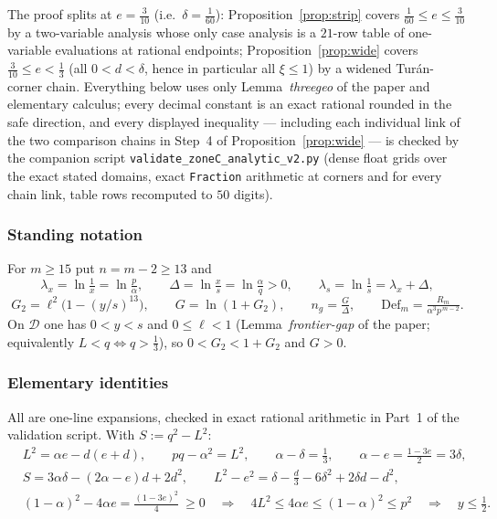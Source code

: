 \documentclass[11pt]{article}
\theoremstyle{remark}
\theoremstyle{plain}
\theoremstyle{plain}
\newcommand{\D}{\mathcal D}
\begin{document}
The proof splits at $e=\tfrac3{10}$ (i.e.\ $\delta=\tfrac1{60}$):
Proposition~\ref{prop:strip} covers $\tfrac1{60}\le e\le\tfrac3{10}$ by a
two-variable analysis whose only case analysis is a $21$-row table of
one-variable evaluations at rational endpoints; Proposition~\ref{prop:wide}
covers $\tfrac3{10}\le e<\tfrac13$ (all $0<d<\delta$, hence in particular
all $\xi\le1$) by a widened Tur\'an-corner chain.  Everything below uses only
Lemma~\emph{threegeo} of the paper and elementary calculus; every decimal
constant is an exact rational rounded in the safe direction, and every
displayed inequality --- including each individual link of the two
comparison chains in Step~4 of Proposition~\ref{prop:wide} --- is checked
by the companion script \texttt{validate\_zoneC\_analytic\_v2.py} (dense
float grids over the exact stated domains, exact \texttt{Fraction}
arithmetic at corners and for every chain link, table rows recomputed to
$50$ digits).

\subsubsection*{Standing notation}
For $m\ge15$ put $n=m-2\ge13$ and
\[
 \lambda_x=\ln\tfrac1x=\ln\tfrac p\alpha,\qquad
 \Delta=\ln\tfrac xs=\ln\tfrac\alpha q>0,\qquad
 \lambda_s=\ln\tfrac1s=\lambda_x+\Delta,
\]
\[
 G_2=\ell^2\bigl(1-(y/s)^{13}\bigr),\qquad G=\ln(1+G_2),\qquad
 n_g=\tfrac G\Delta,\qquad
 \mathrm{Def}_m=\tfrac{R_m}{\alpha^3p^{\,m-2}} .
\]
On $\D$ one has $0<y<s$ and $0\le\ell<1$ (Lemma~\emph{frontier-gap} of the
paper; equivalently $L<q\iff q>\tfrac13$), so $0<G_2<1+G_2$ and $G>0$.

\subsubsection*{Elementary identities}
All are one-line expansions, checked in exact rational arithmetic in Part~1
of the validation script.  With $S:=q^2-L^2$:
\begin{align}
 &L^2=\alpha e-d(e+d),\qquad pq-\alpha^2=L^2,\qquad
 \alpha-\delta=\tfrac13,\qquad \alpha-e=\tfrac{1-3e}2=3\delta,
 \label{eq:id1}\\
 &S=3\alpha\delta-(2\alpha-e)d+2d^2,\qquad
 L^2-e^2=\delta-\tfrac d3-6\delta^2+2\delta d-d^2,\label{eq:id2}\\
 &(1-\alpha)^2-4\alpha e=\tfrac{(1-3e)^2}4\ \ge0
 \quad\Longrightarrow\quad 4L^2\le4\alpha e\le(1-\alpha)^2\le p^2
 \quad\Longrightarrow\quad y\le\tfrac12.\label{eq:yhalf}
\end{align}
\end{document}
